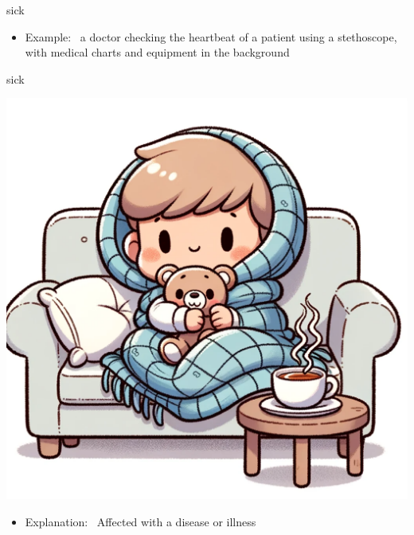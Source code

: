 \documentclass[avery5371, grid,frame]{flashcards}
\begin{document}
\begin{flashcard}{sick}
\begin{center}
\begin{minipage}[c]{.45\textwidth}
\begin{itemize}
            \item Example: \ a doctor checking the heartbeat of a patient using a stethoscope, with medical charts and equipment in the background
            \end{itemize}
        \end{minipage}
    \end{center}
    \vspace*{\fill}
\end{flashcard}\begin{flashcard}{sick}
    \vspace*{\fill}
    \begin{center}
        \begin{minipage}[c]{.45\textwidth}
            \includegraphics[width=\textwidth]{cards/s/sick/sick - a young child wrapped in a blanket on a couch, clutching a teddy bear, with a cup of warm tea on a nearby table.png}
        \end{minipage}
        \begin{minipage}[c]{.45\textwidth}
            \begin{itemize}\setlength\itemsep{12pt}
            \item Explanation: \ Affected with a disease or illness


\end{itemize}
\end{minipage}
\end{center}
\end{flashcard}
\end{document}
